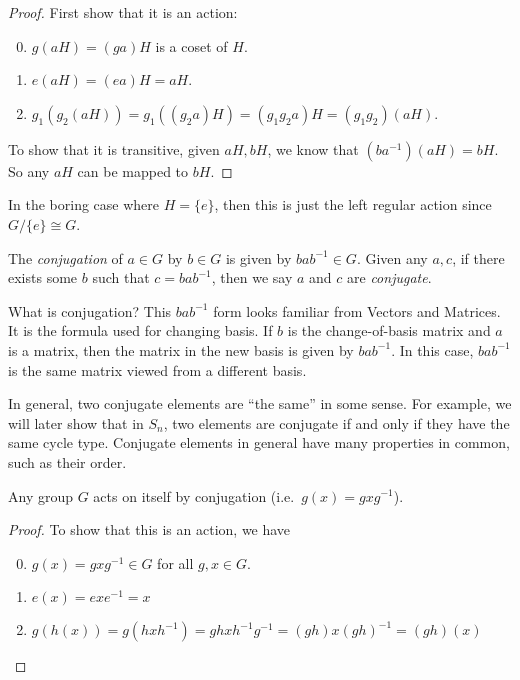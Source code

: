 \documentclass[a4paper]{article}
\begin{document}
\begin{proof}
  First show that it is an action:
  \begin{enumerate}[label=\arabic{*}.]
      \setcounter{enumi}{-1}
    \item $g(aH) = (ga)H$ is a coset of $H$.
    \item $e(aH) = (ea)H = aH$.
    \item $g_1(g_2(aH)) = g_1((g_2a)H) = (g_1g_2a)H = (g_1g_2)(aH)$.
  \end{enumerate}

  To show that it is transitive, given $aH, bH$, we know that $(ba^{-1})(aH) = bH$. So any $aH$ can be mapped to $bH$.
\end{proof}
In the boring case where $H = \{e\}$, then this is just the left regular action since $G/\{e\} \cong G$.

\begin{defi}
  The \emph{conjugation} of $a\in G$ by $b\in G$ is given by $bab^{-1}\in G$. Given any $a, c$, if there exists some $b$ such that $c = bab^{-1}$, then we say $a$ and $c$ are \emph{conjugate}.
\end{defi}
What is conjugation? This $bab^{-1}$ form looks familiar from Vectors and Matrices. It is the formula used for changing basis. If $b$ is the change-of-basis matrix and $a$ is a matrix, then the matrix in the new basis is given by $bab^{-1}$. In this case, $bab^{-1}$ is the same matrix viewed from a different basis.

In general, two conjugate elements are ``the same'' in some sense. For example, we will later show that in $S_n$, two elements are conjugate if and only if they have the same cycle type. Conjugate elements in general have many properties in common, such as their order.

\begin{lemma}
  Any group $G$ acts on itself by conjugation (i.e.\ $g(x) = gxg^{-1}$).
\end{lemma}

\begin{proof}
  To show that this is an action, we have
  \begin{enumerate}[label=\arabic{*}.]
      \setcounter{enumi}{-1}
    \item $g(x) = gxg^{-1} \in G$ for all $g, x\in G$.
    \item $e(x) = exe^{-1} = x$
    \item $g(h(x)) = g(hxh^{-1}) = ghxh^{-1}g^{-1} = (gh)x(gh)^{-1} = (gh)(x)$
  \end{enumerate}
\end{proof}
\end{document}
